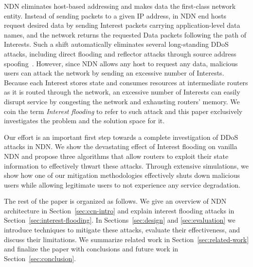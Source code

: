 NDN eliminates host-based addressing and makes data the first-class network entity. 
Instead of sending packets to a given IP address, in NDN end hosts request desired data by sending Interest packets carrying application-level data names, and the network returns the requested Data packets following the path of Interests. 
Such a shift automatically eliminates several long-standing DDoS attacks, including direct flooding and reflector attacks through source address spoofing~\cite{mirkovic2004taxonomy}.
%
However, since NDN allows any host to request any data, malicious users can attack the network by sending an excessive number of Interests. 
Because each Interest stores state and consumes resources at intermediate routers as it is routed through the network, an excessive number of Interests can easily disrupt service by congesting the network and exhausting routers' memory. 
We coin the term {\it Interest flooding} to refer to such attack and
this paper exclusively investigates the problem and the solution space for it. 

Our effort is an important first step towards a complete investigation of DDoS attacks in NDN. We show the devastating effect of Interest flooding on vanilla NDN and propose three algorithms that allow routers to exploit their state information to effectively thwart these attacks. Through extensive simulations,  we show how one of our mitigation methodologies effectively shuts down malicious users while allowing legitimate users to not experience any service degradation. 

The rest of the paper is organized as follows. We give an overview of NDN architecture in Section~\ref{sec:ccn-intro} and explain interest flooding attacks in Section~\ref{sec:interest-flooding}. In Sections~\ref{sec:design} and \ref{sec:evaluation} we introduce techniques to mitigate these attacks, evaluate their effectiveness, and discuss their limitations. We summarize related work in Section~\ref{sec:related-work} and finalize the paper with conclusions and future work in Section~\ref{sec:conclusion}.

